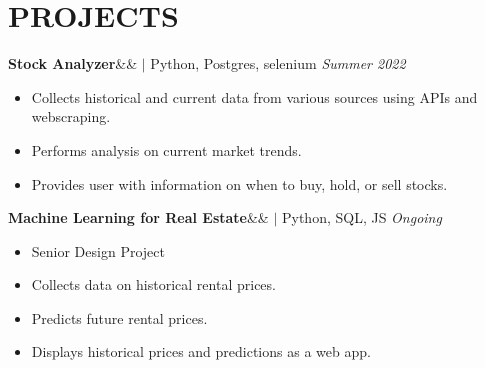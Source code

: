 \documentclass[11pt, a4paper, roman]{moderncv}
\newcommand{\project}[5]{
	\textbf{#1}\ifx&#2&{}
	\else
    		\href{#2}{\:\small\faGithub\:}\fi$|$ #3
	\hfill\textit{#4}
	#5
	\vspace{2mm}
}
\begin{document}
\vspace*{-2mm}
\section{PROJECTS}

{\project{Stock Analyzer}{}{Python, Postgres, selenium}{Summer 2022}
	{\begin{itemize}
		\item Collects historical and current data from various sources using APIs and webscraping.
		\item Performs analysis on current market trends.
		\item Provides user with information on when to buy, hold, or sell stocks.
	\end{itemize}}
}

{\project{Machine Learning for Real Estate}{}{Python, SQL, JS}{Ongoing}
	{\begin{itemize}
		\item Senior Design Project
		\item Collects data on historical rental prices.
		\item Predicts future rental prices.
		\item Displays historical prices and predictions as a web app.
	\end{itemize}}
}
\end{document}
